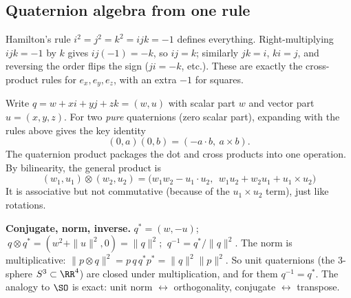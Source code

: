 \subsection{Quaternion algebra from one rule}\label{sec:rot:quaternion-algebra-rule}
Hamilton's rule $i^2=j^2=k^2=ijk=-1$ defines everything. Right-multiplying $ijk=-1$ by $k$ gives $ij(-1)=-k$, so $ij=k$; similarly $jk=i$, $ki=j$, and reversing the order flips the sign ($ji=-k$, etc.). These are exactly the cross-product rules for $e_x,e_y,e_z$, with an extra $-1$ for squares.

Write $q=w+xi+yj+zk=(w,u)$ with scalar part $w$ and vector part $u=(x,y,z)$. For two \emph{pure} quaternions (zero scalar part), expanding with the rules above gives the key identity
\begin{equation}
(0,a)(0,b)=(-a\cdot b,\ a\times b).\label{eq:rot:purequat}
\end{equation}
The quaternion product packages the dot and cross products into one operation. By bilinearity, the general product is
\[
\boxed{(w_1,u_1)\otimes(w_2,u_2)=\big(w_1w_2-u_1\cdot u_2,\ \ w_1u_2+w_2u_1+u_1\times u_2\big)}
\]
It is associative but not commutative (because of the $u_1\times u_2$ term), just like rotations.

\textbf{Conjugate, norm, inverse.} $q^*=(w,-u)$; $\ q\otimes q^*=(w^2+\|u\|^2,0)=\|q\|^2$; $\ q^{-1}=q^*/\|q\|^2$. The norm is multiplicative: $\|p\otimes q\|^2=p\,q\,q^*p^*=\|q\|^2\|p\|^2$. So unit quaternions (the 3-sphere $S^3\subset\RR^4$) are closed under multiplication, and for them $q^{-1}=q^*$. The analogy to $\SO$ is exact: unit norm $\leftrightarrow$ orthogonality, conjugate $\leftrightarrow$ transpose.
